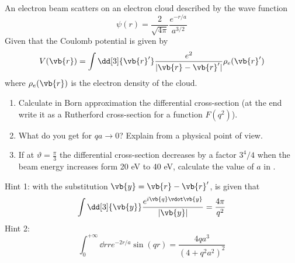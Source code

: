 \begin{esercizio}
   An electron beam scatters on an electron cloud described by the wave function
   \begin{equation*}
      \psi(r)
      =\frac{2}{\sqrt{4 \pi}} \frac{e^{-r/a}}{a^{3/2}}
   \end{equation*}
   Given that the Coulomb potential is given by
   \begin{equation*}
      V(\vb{r})
      =\int \dd[3]{\vb{r}'} \frac{e^2}{| \vb{r} - \vb{r}' |} \rho_e(\vb{r}')
   \end{equation*}
   where $\rho_e(\vb{r})$ is the electron density of the cloud.
   \begin{enumerate}[label=\alph*), leftmargin=0.6cm]
      \item Calculate in Born approximation the differential cross-section (at the end write it as a Rutherford cross-section for a function $F(q^2)$).
      \item What do you get for $qa \to 0$? Explain from a physical point of view.
      \item If at $\vartheta=\frac{\pi}{3}$ the differential cross-section decreases by a factor $3^4/4$ when the beam energy increases form 20 eV to 40 eV, calculate the value of $a$ in \A.
   \end{enumerate}
   Hint 1: with the substitution $\vb{y}=\vb{r} - \vb{r}'$, is given that
   \begin{equation*}
      \int \dd[3]{\vb{y}} \frac{e^{i \vb{q} \vdot \vb{y}}}{|\vb{y}|}
      =\frac{4 \pi}{q^2}
   \end{equation*}
   Hint 2:
   \begin{equation*}
      \int_{0}^{+\infty} \dd{r} r e^{-2r/a} \sin(qr)
      =\frac{4qa^3}{(4 + q^2a^2)^2}
   \end{equation*}
\end{esercizio}
